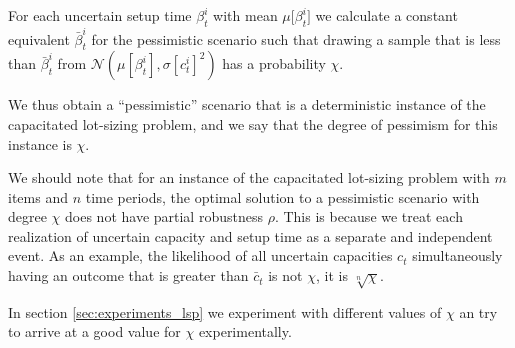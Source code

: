 For each uncertain setup time $\beta_t^i$ with mean $\mu \lbrack \beta_t^i \rbrack$ we
calculate a constant equivalent $\bar{\beta}^i_t$ for the pessimistic scenario
such that drawing a sample that is less than $\bar{\beta}_t^i$ from
$\mathcal{N}(\mu[\beta_t^i], \sigma[c_t^i]^2)$ has a probability $\chi$.

We thus obtain a ``pessimistic'' scenario that is a deterministic
instance of the capacitated lot-sizing problem, and we say that the
degree of pessimism for this instance is $\chi$.

We should note that for an instance of the capacitated lot-sizing
problem with $m$ items and $n$ time periods, the optimal solution to a
pessimistic scenario with degree $\chi$  does
not have partial robustness $\rho$. This is because we treat each
realization of uncertain capacity and setup time as a separate and
independent event. As an example, the likelihood of all uncertain
capacities $c_t$ simultaneously having an outcome that
is greater than $\bar{c}_t$ is not $\chi$, it is $\sqrt[n]{\chi}$.

In section \ref{sec:experiments_lsp} we experiment with different
values of $\chi$ an try to arrive at a good value for $\chi$
experimentally.

